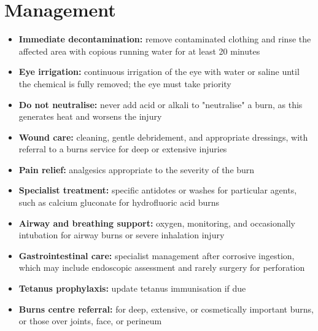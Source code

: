 \section*{Management}
\begin{itemize}
    \item \textbf{Immediate decontamination:} remove contaminated clothing and rinse the affected area with copious running water for at least 20 minutes
    \item \textbf{Eye irrigation:} continuous irrigation of the eye with water or saline until the chemical is fully removed; the eye must take priority
    \item \textbf{Do not neutralise:} never add acid or alkali to "neutralise" a burn, as this generates heat and worsens the injury
    \item \textbf{Wound care:} cleaning, gentle debridement, and appropriate dressings, with referral to a burns service for deep or extensive injuries
    \item \textbf{Pain relief:} analgesics appropriate to the severity of the burn
    \item \textbf{Specialist treatment:} specific antidotes or washes for particular agents, such as calcium gluconate for hydrofluoric acid burns
    \item \textbf{Airway and breathing support:} oxygen, monitoring, and occasionally intubation for airway burns or severe inhalation injury
    \item \textbf{Gastrointestinal care:} specialist management after corrosive ingestion, which may include endoscopic assessment and rarely surgery for perforation
    \item \textbf{Tetanus prophylaxis:} update tetanus immunisation if due
    \item \textbf{Burns centre referral:} for deep, extensive, or cosmetically important burns, or those over joints, face, or perineum
\end{itemize}


